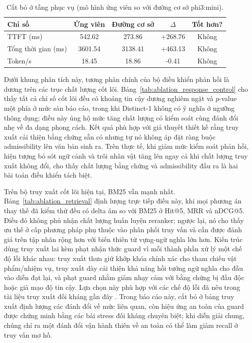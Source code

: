 ﻿\documentclass[a4paper,12pt]{article}
\begin{document}
\begin{table}[t]
\centering
\caption{Cắt bỏ ở tầng phục vụ (mô hình ứng viên so với đường cơ sở phi3:mini).}
\label{tab:ablation_serving}
\begingroup
\footnotesize
\setlength{\tabcolsep}{4pt}
\begin{tabular}{lcccc}
\toprule
Chỉ số & Ứng viên & Đường cơ sở & \(\Delta\) & Tốt hơn? \\
\midrule
TTFT (ms) & 542.62 & 273.86 & +268.76 & Không \\
Tổng thời gian (ms) & 3601.54 & 3138.41 & +463.13 & Không \\
Token/s & 18.45 & 18.86 & -0.41 & Không \\
\bottomrule
\end{tabular}
\endgroup
\end{table}

Dưới khung phân tích này, tương phản chính của bộ điều khiển phản hồi là dương trên các trục chất lượng cốt lõi. Bảng~\ref{tab:ablation_response_control} cho thấy tất cả chỉ số cốt lõi đều có khoảng tin cậy dương nghiêm ngặt và \(p\)-value một phía ở mức sàn báo cáo, trong khi Distinct-1 không có ý nghĩa ở ngưỡng thông dụng; điều này ủng hộ mức tăng chất lượng có kiểm soát cùng đánh đổi nhẹ về đa dạng phong cách. Kết quả phù hợp với giả thuyết thiết kế rằng truy xuất cải thiện bằng chứng sẵn có nhưng tự nó không áp đặt ràng buộc admissibility lên văn bản sinh ra. Trên thực tế, khi giảm mức kiểm soát phản hồi, hiện tượng bỏ sót ngữ cảnh và trôi nhân vật tăng lên ngay cả khi chất lượng truy xuất không đổi, cho thấy chất lượng bằng chứng và admissibility đầu ra là hai bài toán điều khiển tách biệt.

Trên bộ truy xuất cốt lõi hiện tại, BM25 vẫn mạnh nhất. Bảng~\ref{tab:ablation_retrieval} định lượng trực tiếp điều này, khi mọi phương án thay thế đã kiểm thử đều có delta âm so với BM25 ở Hit@5, MRR và nDCG@5. Điều đó không phủ nhận chất lượng huấn luyện reranker; ngược lại, nó cho thấy ưu thế ở cấp phương pháp phụ thuộc vào phân phối truy vấn và cần được đánh giá trên tập nhãn rộng hơn với biến thiên từ vựng-ngữ nghĩa lớn hơn. Kiến trúc dùng truy xuất lai kèm phạt nhận thức guard vì mỗi thành phần xử lý một chế độ lỗi khác nhau: truy xuất thưa giữ khớp khóa chính xác cho tham chiếu vật phẩm/nhiệm vụ, truy xuất dày cải thiện khả năng hồi tưởng ngữ nghĩa cho đầu vào diễn đạt lại, và phạt guard nhằm giảm nhạy cảm với bằng chứng bị đầu độc hoặc giả mạo độ tin cậy. Lựa chọn này phù hợp với các chế độ lỗi đã nêu trong tài liệu truy xuất đối kháng gần đây \cite{Zou2025PoisonedRAG,Chaturvedi2025AIP}. Trong báo cáo này, cắt bỏ ở bảng truy xuất định lượng các đánh đổi về mức liên quan, còn hiệu ứng an toàn của guard được chứng minh bằng các bài stress đối kháng chuyên biệt; khi diễn giải chung, chúng chỉ ra một đánh đổi vận hành thiên về an toàn có thể làm giảm recall ở truy vấn mơ hồ.
\end{document}
